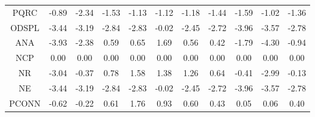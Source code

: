 \documentclass[11pt,a4paper]{report}
\begin{document}
\begin{longtable}{ | c || c | c | c | c | c | c | c | c | c || c |}
PQRC &  \cellcolor[HTML]{FFE7E7} -0.89 &  \cellcolor[HTML]{FFC7C7} -2.34 &  \cellcolor[HTML]{FFD7D7} -1.53 &  \cellcolor[HTML]{FFDFDF} -1.13 &  \cellcolor[HTML]{FFDFDF} -1.12 &  \cellcolor[HTML]{FFDFDF} -1.18 &  \cellcolor[HTML]{FFD7D7} -1.44 &  \cellcolor[HTML]{FFD7D7} -1.59 &  \cellcolor[HTML]{FFE7E7} -1.02 &  \cellcolor[HTML]{FFDFDF} -1.36 \\
ODSPL &  \cellcolor[HTML]{FFA7A7} -3.44 &  \cellcolor[HTML]{FFAFAF} -3.19 &  \cellcolor[HTML]{FFB7B7} -2.84 &  \cellcolor[HTML]{FFB7B7} -2.83 &  \cellcolor[HTML]{FFFFFF} -0.02 &  \cellcolor[HTML]{FFBFBF} -2.45 &  \cellcolor[HTML]{FFB7B7} -2.72 &  \cellcolor[HTML]{FF9F9F} -3.96 &  \cellcolor[HTML]{FFA7A7} -3.57 &  \cellcolor[HTML]{FFB7B7} -2.78 \\
ANA &  \cellcolor[HTML]{FF9F9F} -3.93 &  \cellcolor[HTML]{FFC7C7} -2.38 &  \cellcolor[HTML]{EFEFFF} 0.59 &  \cellcolor[HTML]{EFEFFF} 0.65 &  \cellcolor[HTML]{D7D7FF} 1.69 &  \cellcolor[HTML]{EFEFFF} 0.56 &  \cellcolor[HTML]{F7F7FF} 0.42 &  \cellcolor[HTML]{FFCFCF} -1.79 &  \cellcolor[HTML]{FF8F8F} -4.30 &  \cellcolor[HTML]{FFE7E7} -0.94 \\
NCP &  \cellcolor[HTML]{FFFFFF} 0.00 &  \cellcolor[HTML]{FFFFFF} 0.00 &  \cellcolor[HTML]{FFFFFF} 0.00 &  \cellcolor[HTML]{FFFFFF} 0.00 &  \cellcolor[HTML]{FFFFFF} 0.00 &  \cellcolor[HTML]{FFFFFF} 0.00 &  \cellcolor[HTML]{FFFFFF} 0.00 &  \cellcolor[HTML]{FFFFFF} 0.00 &  \cellcolor[HTML]{FFFFFF} 0.00 &  \cellcolor[HTML]{FFFFFF} 0.00 \\
NR &  \cellcolor[HTML]{FFAFAF} -3.04 &  \cellcolor[HTML]{FFF7F7} -0.37 &  \cellcolor[HTML]{EFEFFF} 0.78 &  \cellcolor[HTML]{D7D7FF} 1.58 &  \cellcolor[HTML]{DFDFFF} 1.38 &  \cellcolor[HTML]{DFDFFF} 1.26 &  \cellcolor[HTML]{EFEFFF} 0.64 &  \cellcolor[HTML]{FFF7F7} -0.41 &  \cellcolor[HTML]{FFB7B7} -2.99 &  \cellcolor[HTML]{FFFFFF} -0.13 \\
NE &  \cellcolor[HTML]{FFA7A7} -3.44 &  \cellcolor[HTML]{FFAFAF} -3.19 &  \cellcolor[HTML]{FFB7B7} -2.84 &  \cellcolor[HTML]{FFB7B7} -2.83 &  \cellcolor[HTML]{FFFFFF} -0.02 &  \cellcolor[HTML]{FFBFBF} -2.45 &  \cellcolor[HTML]{FFB7B7} -2.72 &  \cellcolor[HTML]{FF9F9F} -3.96 &  \cellcolor[HTML]{FFA7A7} -3.57 &  \cellcolor[HTML]{FFB7B7} -2.78 \\
PCONN &  \cellcolor[HTML]{FFEFEF} -0.62 &  \cellcolor[HTML]{FFF7F7} -0.22 &  \cellcolor[HTML]{EFEFFF} 0.61 &  \cellcolor[HTML]{CFCFFF} 1.76 &  \cellcolor[HTML]{E7E7FF} 0.93 &  \cellcolor[HTML]{EFEFFF} 0.60 &  \cellcolor[HTML]{F7F7FF} 0.43 &  \cellcolor[HTML]{FFFFFF} 0.05 &  \cellcolor[HTML]{FFFFFF} 0.06 &  \cellcolor[HTML]{F7F7FF} 0.40 \\

\end{longtable}
\end{document}
